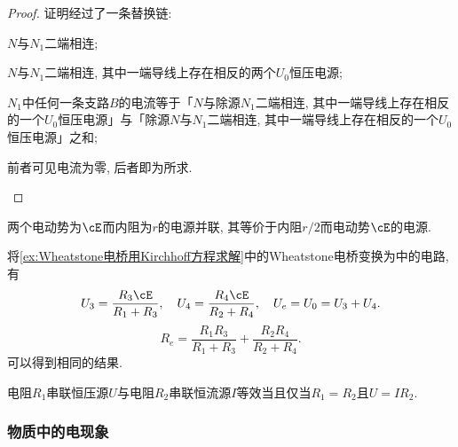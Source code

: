 \documentclass[../Electromagnetism.tex]{subfiles}
\begin{document}
\begin{proof}
	证明经过了一条替换链:
	\begin{cenum}
		\item $N$与$N_1$二端相连;
		\item $N$与$N_1$二端相连, 其中一端导线上存在相反的两个$U_0$恒压电源;
		\item $N_1$中任何一条支路$B$的电流等于「$N$与除源$N_1$二端相连, 其中一端导线上存在相反的一个$U_0$恒压电源」与「除源$N$与$N_1$二端相连, 其中一端导线上存在相反的一个$U_0$恒压电源」之和;
		\item 前者可见电流为零, 后者即为所求.\qedhere
	\end{cenum}
\end{proof}
\begin{ex}
	两个电动势为$\cE$而内阻为$r$的电源并联, 其等价于内阻$r/2$而电动势$\cE$的电源.
\end{ex}
\begin{ex}
	将\cref{ex:Wheatstone电桥用Kirchhoff方程求解}中的Wheatstone电桥变换为中的电路, 有
	\[ U_3 = \frac{R_3 \cE}{R_1 + R_3},\quad U_4 = \frac{R_4 \cE}{R_2 + R_4}, \quad U_e = U_0 = U_3 + U_4. \]
	\[ R_e = \frac{R_1R_3}{R_1 + R_3} + \frac{R_2 R_4}{R_2 + R_4}. \]
	可以得到相同的结果.
\end{ex}
\begin{theorem}[恒流电源与恒压电源的等效]
	电阻$R_1$串联恒压源$U$与电阻$R_2$串联恒流源$I$等效当且仅当$R_1 = R_2$且$U = IR_2$.
\end{theorem}


\subsubsection{物质中的电现象} %
\label{ssub:物质中的电现象}
\end{document}
